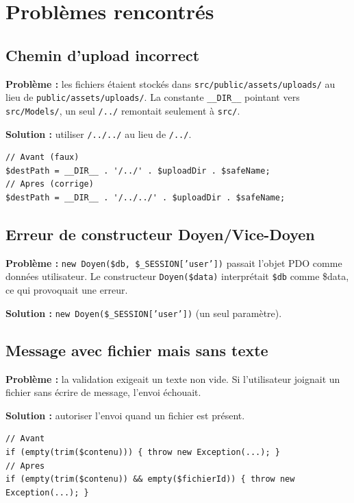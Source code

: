 \documentclass[12pt,a4paper]{article}
\begin{document}
\section{Probl\`emes rencontr\'es}

\subsection{Chemin d'upload incorrect}

\textbf{Probl\`eme :} les fichiers \'etaient stock\'es dans
\texttt{src/public/assets/uploads/} au lieu de
\texttt{public/assets/uploads/}. La constante \texttt{\_\_DIR\_\_} pointant
vers \texttt{src/Models/}, un seul \texttt{/../} remontait seulement \`a
\texttt{src/}.

\textbf{Solution :} utiliser \texttt{/../../} au lieu de \texttt{/../}.

\begin{lstlisting}[style=phpphp]
// Avant (faux)
$destPath = __DIR__ . '/../' . $uploadDir . $safeName;
// Apres (corrige)
$destPath = __DIR__ . '/../../' . $uploadDir . $safeName;
\end{lstlisting}

\subsection{Erreur de constructeur Doyen/Vice-Doyen}

\textbf{Probl\`eme :} \texttt{new Doyen(\$db, \$\_SESSION['user'])} passait
l'objet PDO comme donn\'ees utilisateur. Le constructeur
\texttt{Doyen(\$data)} interpr\'etait \texttt{\$db} comme \$data, ce qui
provoquait une erreur.

\textbf{Solution :} \texttt{new Doyen(\$\_SESSION['user'])} (un seul
param\`etre).

\subsection{Message avec fichier mais sans texte}

\textbf{Probl\`eme :} la validation exigeait un texte non vide. Si
l'utilisateur joignait un fichier sans \'ecrire de message, l'envoi \'echouait.

\textbf{Solution :} autoriser l'envoi quand un fichier est pr\'esent.

\begin{lstlisting}[style=phpphp]
// Avant
if (empty(trim($contenu))) { throw new Exception(...); }
// Apres
if (empty(trim($contenu)) && empty($fichierId)) { throw new Exception(...); }
\end{lstlisting}
\end{document}
